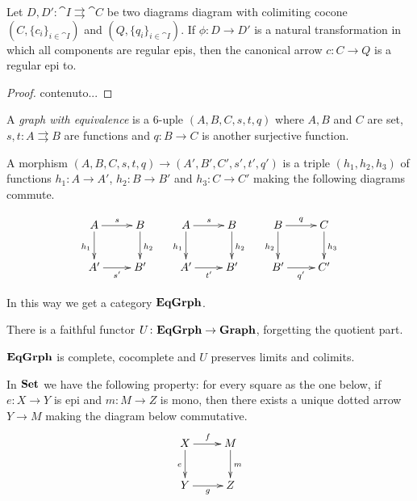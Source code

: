 \begin{lemma}\label{lem:regepi}
	Let $D, D'\colon \cat{I}\rightrightarrows  \cat{C}$ be two diagrams diagram with colimiting cocone $(C, \{c_i\}_{i\in \cat{I}})$ and   $(Q, \{q_i\}_{i\in \cat{I}})$. If $\phi\colon D\to D'$ is a natural transformation in which all components are regular epis, then the canonical arrow  $c\colon C\to Q$ is a regular epi to.
\end{lemma}
\begin{proof}
	contenuto...
\end{proof}




\begin{definition}
	A \emph{graph with equivalence} is a 6-uple $(A, B, C, s, t, q)$ where $A, B$ and $C$ are set, $s,t\colon A\rightrightarrows B$ are functions and $q\colon B\to C$ is another surjective function.
	
	A morphism  $(A, B, C, s, t, q)\to (A', B', C', s', t', q')$ is a triple $(h_1, h_2, h_3)$ of functions $h_1\colon A\to A'$, $h_2\colon B\to B'$ and $h_3\colon C\to C'$ making the following diagrams commute.
	
	\[\xymatrix{A \ar[r]^{s} \ar[d]_{h_1} & B \ar[d]^{h_2} & A \ar[r]^{s} \ar[d]_{h_1}& B \ar[d]^{h_2} & B \ar[d]_{h_2} \ar[r]^{q} & C \ar[d]^{h_3}\\A' \ar[r]_{s'} & B' & A ' \ar[r]_{t'}& B' & B' \ar[r]_{q'} & C'}\]
	
	In this way we get a category $\mathbf{EqGrph}$.
\end{definition}

\begin{remark}\label{rem:fedele}
	There is a faithful functor $U\colon \mathbf{EqGrph}\to \mathbf{Graph}$, forgetting the quotient part. 
\end{remark}

\begin{prop}\label{prop:limits}
	$\mathbf{EqGrph}$ is complete, cocomplete and $U$ preserves limits and colimits.
\end{prop}

\begin{remark}\label{rem:ima}In $\mathbf{Set}$ we have the following property: for every square as the one below, if $e\colon X\to Y$ is epi and $m\colon M\to Z$ is mono, then there exists a unique dotted arrow $Y\to M$ making the diagram below commutative.
	\[\xymatrix{X \ar[r]^{f} \ar[d]_{e}& M \ar[d]^{m}\\ Y \ar[r]_{g} & Z}\] 
\end{remark}

